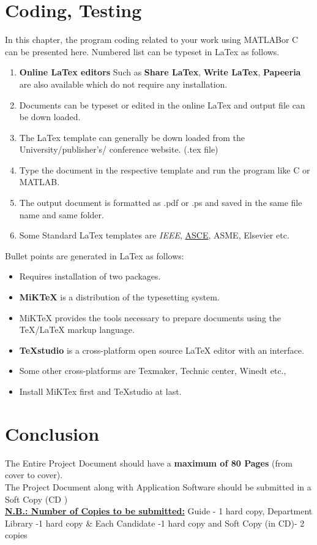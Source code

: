 \documentclass[BTech]{srmuthesis}
\begin{document}
\chapter{Coding, Testing}
In this chapter, the program coding related to your work using MATLAB\texttrademark or C can be presented here. Numbered list can be typeset in LaTex as follows.
\begin{enumerate}
\item  \textbf{Online LaTex editors} Such as \textbf{Share LaTex}, \textbf{Write LaTex}, \textbf{Papeeria} 
are also available which do not require any installation. \vspace{5mm}
\item  Documents can be typeset or edited in the online LaTex and output file can be down loaded.\vspace{5mm}
\item  The LaTex template can generally be down loaded from the University/publisher's/ conference website. (.tex file) \vspace{5mm}
\item Type the document in the respective template and run the program like C or MATLAB. \vspace{5mm}
\item  The output document is formatted as .pdf or .ps and saved in the same file name and same folder. \vspace{5mm}
\item  Some Standard LaTex templates are \textit{IEEE}, \underline{ASCE}, \textsf{ASME}, Elsevier etc. \vspace{5mm}
\end{enumerate}
Bullet points are generated in LaTex as follows:
\begin{itemize}
\item [\ding{92}] Requires installation of two packages.
\item [\ding{92}]\textbf{MiKTeX} is a distribution of the typesetting system.
\item [\ding{92}] MiKTeX provides the tools necessary to prepare documents using the TeX/LaTeX markup language. 
\item [\ding{92}] \textbf{TeXstudio} is a cross-platform open source LaTeX editor with an interface. 
\item [\ding{92}] Some other cross-platforms are Texmaker, Technic center, Winedt etc.,
\item [\ding{92}] Install MiKTex first and TeXstudio at last.
\end{itemize}
\chapter{Conclusion}
The Entire Project Document should have a \textbf{maximum of 80 Pages} (from cover to cover).\\
The Project Document along with Application Software should be submitted in a Soft Copy (CD )\\
\underline{\textbf{N.B.: Number of Copies to be submitted:}}
Guide - 1 hard copy, Department Library -1 hard copy \&
Each Candidate -1 hard copy and Soft Copy (in CD)- 2 copies
\end{document}

